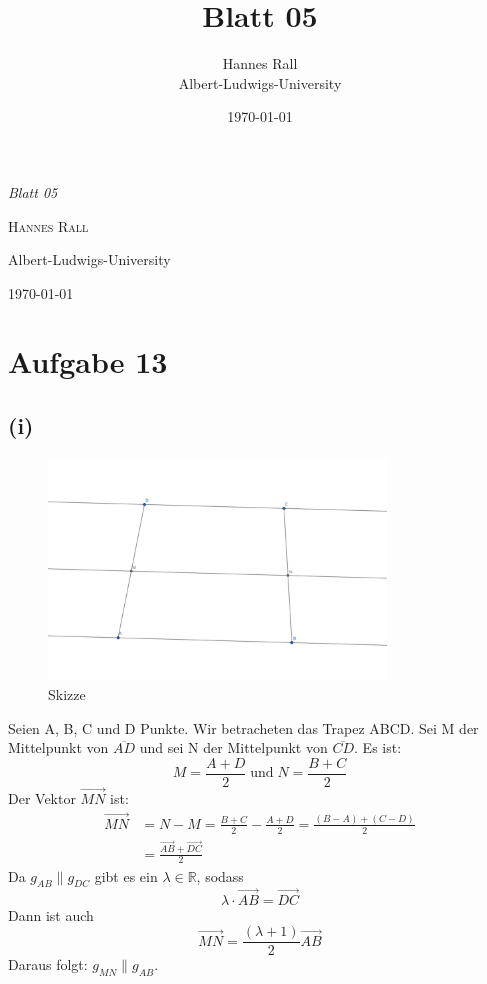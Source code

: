 \documentclass[12pt,a4paper]{article}
\title{Blatt 05}
\author{Hannes Rall \\ Albert-Ludwigs-University}
\date{\today}
\begin{document}
\begin{titlepage}
    \centering
    \vspace*{2cm}
    {\Huge\itshape Blatt 05\par}
    \vspace{2cm}
    {\Large\textsc{Hannes Rall}\par}
    \vfill
    {\large Albert-Ludwigs-University\\}
    \vspace{1cm}
    {\large\today\par}
\end{titlepage}

\newpage
\section*{Aufgabe 13}
\subsection*{(i)}
\begin{figure}[htbp]
    \centering        
    \includegraphics[width=0.8\textwidth]{Blatt05_Aufgabe_13_i.png}
    \caption{Skizze}
    \label{fig:mein_bild}
\end{figure}
\noindent Seien A, B, C und D Punkte. Wir betracheten das Trapez ABCD. Sei M der Mittelpunkt von $\overline{AD}$ und sei N der Mittelpunkt von $\overline{CD}$.
Es ist: \\
\[
    M = \frac{A + D}{2} \;\text{und}\; N = \frac{B+C}{2}
\]
Der Vektor $\overrightarrow{MN}$ ist: \\
\begin{align*}
    \overrightarrow{MN} &= N - M = \frac{B+C}{2} - \frac{A + D}{2} = \frac{(B-A) + (C-D)}{2} \\
                        &= \frac{\overrightarrow{AB} + \overrightarrow{DC}}{2}
\end{align*}
Da $g_{AB} \parallel g_{DC}$ gibt es ein $\lambda \in \mathbb{R}$, sodass
\[
    \lambda \cdot \overrightarrow{AB} = \overrightarrow{DC}
\]
Dann ist auch
\[
    \overrightarrow{MN} = \frac{(\lambda + 1)}{2} \overrightarrow{AB}
\]
Daraus folgt: $g_{MN} \parallel g_{AB}$.
\end{document}

